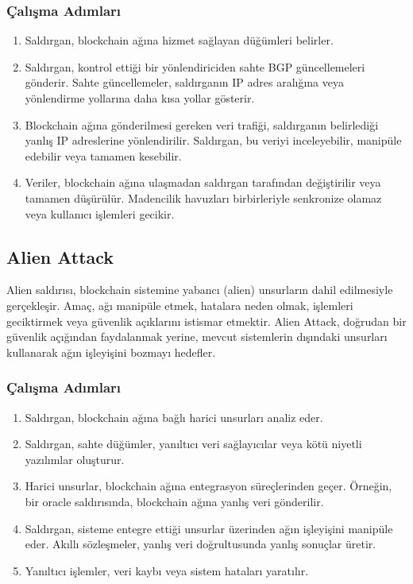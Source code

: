 \subsubsection{Çalışma Adımları}

\begin{enumerate}
    \item Saldırgan, blockchain ağına hizmet sağlayan düğümleri belirler.
    \item Saldırgan, kontrol ettiği bir yönlendiriciden sahte BGP güncellemeleri gönderir. Sahte güncellemeler, saldırganın IP adres aralığına veya yönlendirme yollarına daha kısa yollar gösterir.
    \item Blockchain ağına gönderilmesi gereken veri trafiği, saldırganın belirlediği yanlış IP adreslerine yönlendirilir. Saldırgan, bu veriyi inceleyebilir, manipüle edebilir veya tamamen kesebilir.
    \item Veriler, blockchain ağına ulaşmadan saldırgan tarafından değiştirilir veya tamamen düşürülür. Madencilik havuzları birbirleriyle senkronize olamaz veya kullanıcı işlemleri gecikir.
\end{enumerate}

\newpage

\subsection{Alien Attack}

Alien saldırısı, blockchain sistemine yabancı (alien) unsurların dahil edilmesiyle gerçekleşir. Amaç, ağı manipüle etmek, hatalara neden olmak, işlemleri geciktirmek veya güvenlik açıklarını istismar etmektir. Alien Attack, doğrudan bir güvenlik açığından faydalanmak yerine, mevcut sistemlerin dışındaki unsurları kullanarak ağın işleyişini bozmayı hedefler. 

\subsubsection{Çalışma Adımları}

\begin{enumerate}
    \item Saldırgan, blockchain ağına bağlı harici unsurları analiz eder.
    \item Saldırgan, sahte düğümler, yanıltıcı veri sağlayıcılar veya kötü niyetli yazılımlar oluşturur.
    \item Harici unsurlar, blockchain ağına entegrasyon süreçlerinden geçer. Örneğin, bir oracle saldırısında, blockchain ağına yanlış veri gönderilir.
    \item Saldırgan, sisteme entegre ettiği unsurlar üzerinden ağın işleyişini manipüle eder. Akıllı sözleşmeler, yanlış veri doğrultusunda yanlış sonuçlar üretir.
    \item Yanıltıcı işlemler, veri kaybı veya sistem hataları yaratılır.
\end{enumerate}

